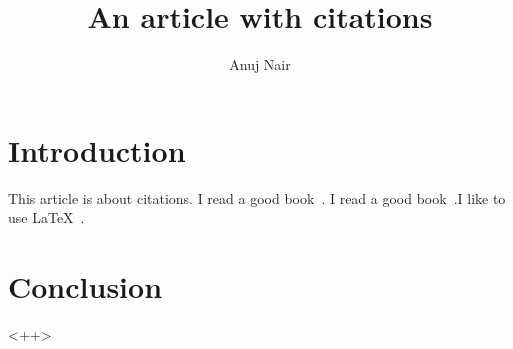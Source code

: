 \documentclass{article}
\title{ An article with citations }
\author{Anuj Nair}
\date{}
\begin{document}
\maketitle

\section{Introduction}
This article is about citations. I read a good book~\cite{smith2012}. I read a good book~\cite{hall2013}.I like to use {\LaTeX}~\cite{latex}.
				





\section{Conclusion}

<++>
\end{document}
